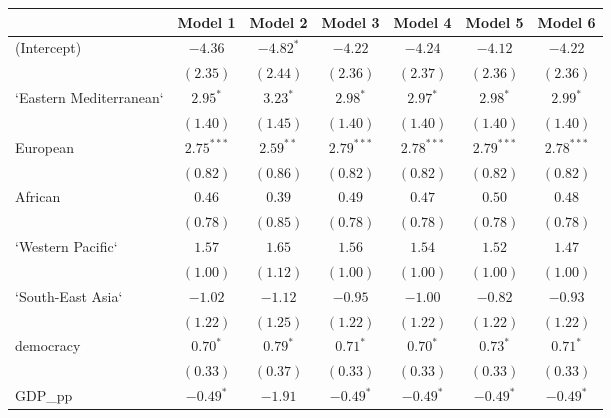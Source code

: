 
\begin{table}[!h]
\begin{center}
\begin{tabular}{l c c c c c c }
\toprule
 & Model 1 & Model 2 & Model 3 & Model 4 & Model 5 & Model 6 \\
\midrule
(Intercept)             & $-4.36$      & $-4.82^{*}$  & $-4.22$      & $-4.24$      & $-4.12$      & $-4.22$      \\
                        & $(2.35)$     & $(2.44)$     & $(2.36)$     & $(2.37)$     & $(2.36)$     & $(2.36)$     \\
`Eastern Mediterranean` & $2.95^{*}$   & $3.23^{*}$   & $2.98^{*}$   & $2.97^{*}$   & $2.98^{*}$   & $2.99^{*}$   \\
                        & $(1.40)$     & $(1.45)$     & $(1.40)$     & $(1.40)$     & $(1.40)$     & $(1.40)$     \\
European                & $2.75^{***}$ & $2.59^{**}$  & $2.79^{***}$ & $2.78^{***}$ & $2.79^{***}$ & $2.78^{***}$ \\
                        & $(0.82)$     & $(0.86)$     & $(0.82)$     & $(0.82)$     & $(0.82)$     & $(0.82)$     \\
African                 & $0.46$       & $0.39$       & $0.49$       & $0.47$       & $0.50$       & $0.48$       \\
                        & $(0.78)$     & $(0.85)$     & $(0.78)$     & $(0.78)$     & $(0.78)$     & $(0.78)$     \\
`Western Pacific`       & $1.57$       & $1.65$       & $1.56$       & $1.54$       & $1.52$       & $1.47$       \\
                        & $(1.00)$     & $(1.12)$     & $(1.00)$     & $(1.00)$     & $(1.00)$     & $(1.00)$     \\
`South-East Asia`       & $-1.02$      & $-1.12$      & $-0.95$      & $-1.00$      & $-0.82$      & $-0.93$      \\
                        & $(1.22)$     & $(1.25)$     & $(1.22)$     & $(1.22)$     & $(1.22)$     & $(1.22)$     \\
democracy               & $0.70^{*}$   & $0.79^{*}$   & $0.71^{*}$   & $0.70^{*}$   & $0.73^{*}$   & $0.71^{*}$   \\
                        & $(0.33)$     & $(0.37)$     & $(0.33)$     & $(0.33)$     & $(0.33)$     & $(0.33)$     \\
GDP\_pp                 & $-0.49^{*}$  & $-1.91$      & $-0.49^{*}$  & $-0.49^{*}$  & $-0.49^{*}$  & $-0.49^{*}$  \\

\end{tabular}
\end{center}
\end{table}
